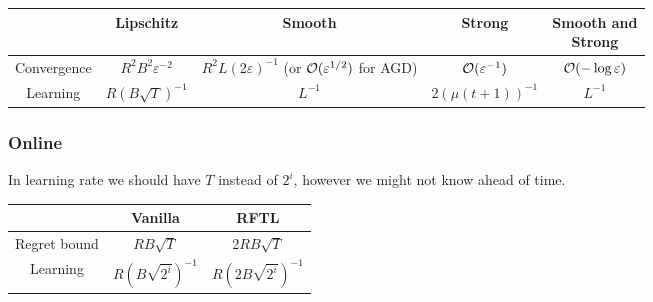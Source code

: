 \documentclass[12pt]{extarticle}
\numberwithin{equation}{subsection}
\begin{document}
\begin{table}[H]
	\centering
	\def\arraystretch{2}
	\begin{tabular}{|c|c|c|c|c|}
		\hline
		                            &
		\textbf{Lipschitz}          &
		\textbf{Smooth}             &
		\textbf{Strong}             &
		\makecell{\textbf{Smooth and}          \\ \textbf{Strong}}
		\\
		\hline
		Convergence                 &
		$ R^2 B^2 \varepsilon^{-2}$ &
		\makecell{$ R^2 L (2\varepsilon)^{-1}$ \\ (or $\mathcal{O}(\varepsilon^{1/2})$ for AGD)} &
		$ \mathcal{O} (\varepsilon^{-1})$    &
		$ \mathcal{O} (-\log  \varepsilon)$
		\\
		\hline
		Learning                    &
		$R (B \sqrt{T})^{-1}$       &
		$L^{-1}$                    &
		$ 2 (\mu (t + 1))^{-1}$     &
		$L^{-1}$
		\\
		\hline
	\end{tabular}
\end{table}

\subsubsection{Online}

In learning rate we should have $T$ instead of $2^i$, however we might not know ahead of time.

\begin{table}[H]
	\centering
	\def\arraystretch{2}
	\begin{tabular}{|c|c|c|}
		\hline                  &
		\textbf{Vanilla}        &
		\textbf{RFTL}
		\\
		\hline
		Regret bound            &
		$ RB \sqrt T$           &
		$ 2RB \sqrt T  $
		\\
		\hline
		Learning                &
		$R (B \sqrt{2^i})^{-1}$ &
		$ R (2 B \sqrt{2^i})^{-1}$
		\\
		\hline
	\end{tabular}
\end{table}
\end{document}
